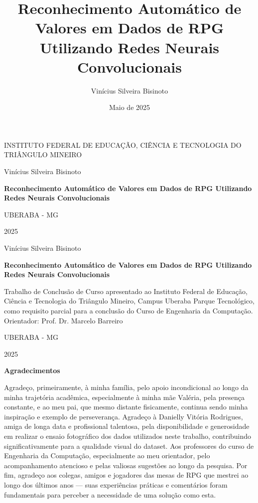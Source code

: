 \documentclass[12pt]{article}
\title{Reconhecimento Automático de Valores em Dados de RPG Utilizando Redes Neurais Convolucionais}
\author{Vinícius Silveira Bisinoto}
\date{Maio de 2025}
\begin{document}
\begin{titlepage}
    \centering
    {\scshape\Large INSTITUTO FEDERAL DE EDUCAÇÃO, CIÊNCIA E TECNOLOGIA DO TRIÂNGULO MINEIRO \par}
    \vfill
    {\Large Vinícius Silveira Bisinoto\par}
    \vfill
    {\bfseries\Large Reconhecimento Automático de Valores em Dados de RPG Utilizando Redes Neurais Convolucionais\par}
    \vfill
    {\large UBERABA - MG\par}
    {\large 2025\par}
\end{titlepage}

\begin{titlepage}
    \centering
    {\Large Vinícius Silveira Bisinoto\par}
    \vspace{1.5cm}
    {\bfseries\Large Reconhecimento Automático de Valores em Dados de RPG Utilizando Redes Neurais Convolucionais\par}
    \vfill
    \begin{flushright}
        \begin{minipage}{0.5\textwidth}
            Trabalho de Conclusão de Curso apresentado ao Instituto Federal de Educação, 
            Ciência e Tecnologia do Triângulo Mineiro, Campus Uberaba Parque Tecnológico, 
            como requisito parcial para a conclusão do Curso de Engenharia da Computação.\\
            Orientador: Prof. Dr. Marcelo Barreiro
        \end{minipage}
    \end{flushright}
    \vfill
    {\large UBERABA - MG\par}
    {\large2025\par}
\end{titlepage}
\begin{center}
    \Large\textbf{Agradecimentos}
\end{center}

Agradeço, primeiramente, à minha família, pelo apoio incondicional ao longo da minha trajetória acadêmica, especialmente 
à minha mãe Valéria, pela presença constante, e ao meu pai, que mesmo distante fisicamente, continua sendo minha 
inspiração e exemplo de perseverança.
Agradeço à Danielly Vitória Rodrigues, amiga de longa data e profissional talentosa, pela disponibilidade e 
generosidade em realizar o ensaio fotográfico dos dados utilizados neste trabalho, contribuindo significativamente 
para a qualidade visual do dataset.
Aos professores do curso de Engenharia da Computação, especialmente ao meu orientador, pelo acompanhamento atencioso 
e pelas valiosas sugestões ao longo da pesquisa. Por fim, agradeço aos colegas, amigos e jogadores das mesas de RPG 
que mestrei ao longo dos últimos anos — suas experiências práticas e comentários foram fundamentais para perceber 
a necessidade de uma solução como esta.
\newpage
\end{document}
